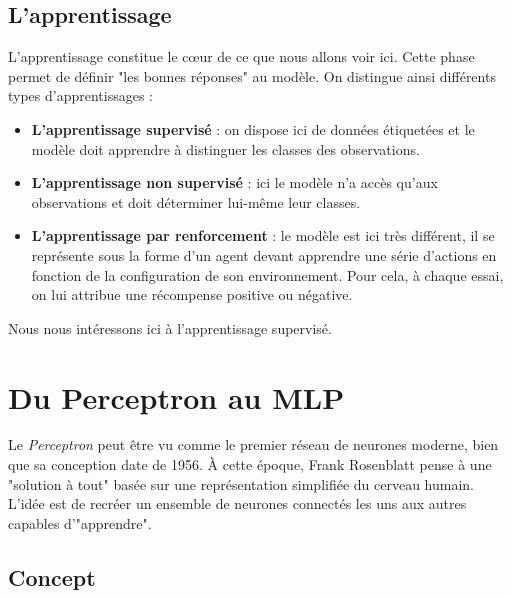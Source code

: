 \subsection{L'apprentissage}

L'apprentissage constitue le cœur de ce que nous allons voir ici. Cette phase permet de définir "les bonnes réponses" 
au modèle. On distingue ainsi différents types d'apprentissages : 
\begin{itemize}
    \item \textbf{L'apprentissage supervisé} : on dispose ici de données étiquetées et le modèle 
    doit apprendre à distinguer les classes des observations. 
    \item \textbf{L'apprentissage non supervisé} : ici le modèle n'a accès qu'aux observations 
    et doit déterminer lui-même leur classes. 
    \item \textbf{L'apprentissage par renforcement} : le modèle est ici très différent, il se représente 
    sous la forme d'un agent devant apprendre une série d'actions en fonction de la configuration de son 
    environnement. Pour cela, à chaque essai, on lui attribue une récompense positive ou négative. 
\end{itemize}

Nous nous intéressons ici à l'apprentissage supervisé. 


\section{Du Perceptron au MLP}

Le \emph{Perceptron} peut être vu comme le premier réseau de neurones moderne, bien que sa conception date de 1956. À cette époque, Frank Rosenblatt pense à une "solution à tout" basée sur une représentation  simplifiée du cerveau humain. L'idée est de recréer un ensemble de neurones connectés les uns aux autres  capables d'"apprendre". 

\subsection{Concept}

